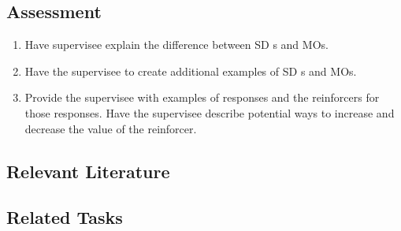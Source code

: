 \subsection{Assessment}
\begin{enumerate}
\item Have supervisee explain the difference between SD s and MOs.
\item Have the supervisee to create additional examples of SD s and MOs.
\item Provide the supervisee with examples of responses and the reinforcers for those responses. Have the supervisee describe potential ways to increase and decrease the value of the reinforcer.
%
\end{enumerate}
%
\subsection{Relevant Literature}
\begin{refsection}
\nocite{test,alang2017police,clayton2018black}
\printbibliography[heading=none]
\end{refsection}
%
\subsection{Related Tasks}
\foureOne{}\\
\fourgEight{}\\
\fouriTwo{}\\
\fourjFour{}\\
\fourjSix{}\\
\fourjSeven{}\\
\fourkNine{}\\
\fourFKSeven{}\\
\fourFKTwentyFour{}\\
\fourFKTwentySix{}\\
\fourFKThirtyOne{}\\
\fourFKThirtyThree{}\\
%
%
%
%
%
%
%
%
%
%
\section[\fourFKThirty{}]{\fourFKThirty{}%
              }
